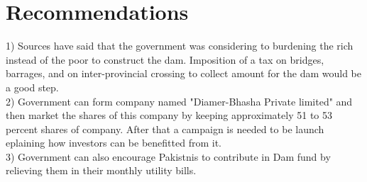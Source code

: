\documentclass[11pt, journal,letterpaper,compsoc]{IEEEtran}
\begin{document}
\section*{Recommendations}
1) Sources  have said that the government was considering to burdening the rich instead of the poor to construct the dam. Imposition of a tax on bridges, barrages, and on inter-provincial crossing to collect amount for the dam would be a good step.  \\
2) Government can form company named "Diamer-Bhasha Private limited"  and then market the shares of this company by keeping approximately 51 to 53 percent shares of company. After that a campaign is needed to be launch eplaining how investors can be benefitted from it.\\
3) Government can also encourage Pakistnis to contribute in Dam fund by relieving them in their monthly utility bills.
\\

\begin{thebibliography}{1}
%
%


\end{thebibliography}




\end{document}
